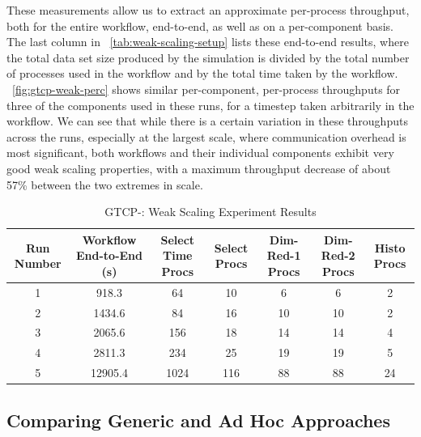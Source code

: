 These measurements allow us to extract an
approximate per-process throughput, both for
the entire workflow, end-to-end, as well as on
a per-component basis.
The last column in ~\autoref{tab:weak-scaling-setup}
lists these end-to-end results, where the total
data set size produced by the simulation is divided
by the total number of processes used in the workflow
and by the total time taken by the workflow.
~\autoref{fig:gtcp-weak-perc}
shows similar per-component, per-process throughputs for
three of the components used in these runs,
for a timestep taken arbitrarily in the workflow.
We can see that while there is a certain variation
in these throughputs across the runs, especially
at the largest scale, where communication overhead
is most significant, both \sys workflows and their
individual components exhibit very good weak scaling properties,
with a maximum throughput decrease of about 57\% between 
the two extremes in scale.

\begin{table}[tbp]
  \centering
  \caption{GTCP-\sys: Weak Scaling Experiment Results}
  \label{tab:weak-scaling-setup}
  \vspace{-0.07in}
  \begin{tabular}{|c|c|c|c|c|c|c|}
    \hline
    Run Number & Workflow End-to-End (s) & Select Time Procs & Select Procs & Dim-Red-1 Procs & Dim-Red-2 Procs & Histo Procs\\
    \hline
    1 & 918.3 & 64 & 10 & 6 & 6 & 2\\
    \hline
    2 & 1434.6 & 84 & 16 & 10 & 10 & 2\\
    \hline
    3 & 2065.6 & 156 & 18 & 14 & 14 & 4\\
    \hline
    4 & 2811.3 & 234 & 25 & 19 & 19 & 5\\
    \hline
    5 & 12905.4 & 1024 & 116 & 88 & 88 & 24\\
    \hline
  \end{tabular}
  \vspace{-0.15in}
\end{table}
\fi

\subsection{Comparing Generic and Ad Hoc Approaches}

